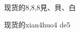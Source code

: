 \begin{entry}{现货的}{8,8,8}{⾒、⾙、⽩}
  \begin{phonetics}{现货的}{xian4huo4 de5}
  \end{phonetics}
\end{entry}
